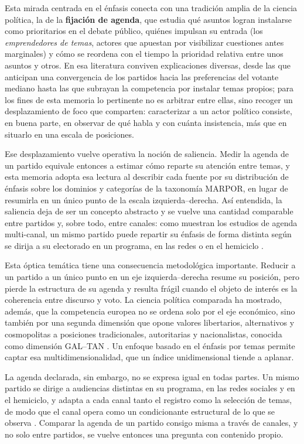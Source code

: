 Esta mirada centrada en el énfasis conecta con una tradición amplia de la ciencia
política, la de la \textbf{fijación de agenda}, que estudia qué asuntos logran
instalarse como prioritarios en el debate público, quiénes impulsan su entrada
(los \emph{emprendedores de temas}, actores que apuestan por visibilizar
cuestiones antes marginales) y cómo se reordena con el tiempo la prioridad
relativa entre unos asuntos y otros. En esa literatura conviven explicaciones
diversas, desde las que anticipan una convergencia de los partidos hacia las
preferencias del votante mediano hasta las que subrayan la competencia por
instalar temas propios; para los fines de esta memoria lo pertinente no es
arbitrar entre ellas, sino recoger un desplazamiento de foco que comparten:
caracterizar a un actor político consiste, en buena parte, en observar de qué
habla y con cuánta insistencia, más que en situarlo en una escala de posiciones.

Ese desplazamiento vuelve operativa la noción de saliencia. Medir la agenda de un
partido equivale entonces a estimar cómo reparte su atención entre temas, y esta
memoria adopta esa lectura al describir cada fuente por su distribución de énfasis
sobre los dominios y categorías de la taxonomía MARPOR, en lugar de resumirla en
un único punto de la escala izquierda--derecha. Así entendida, la saliencia deja
de ser un concepto abstracto y se vuelve una cantidad comparable entre partidos
y, sobre todo, entre canales: como muestran los estudios de agenda multi-canal, un
mismo partido puede repartir su énfasis de forma distinta según se dirija a su
electorado en un programa, en las redes o en el hemiciclo
\cite{ivanusch2024channels}.

Esta óptica temática tiene una consecuencia metodológica importante. Reducir a un
partido a un único punto en un eje izquierda--derecha resume su posición, pero
pierde la estructura de su agenda y resulta frágil cuando el objeto de interés es
la coherencia entre discurso y voto. La ciencia política comparada ha mostrado,
además, que la competencia europea no se ordena solo por el eje económico, sino
también por una segunda dimensión que opone valores libertarios, alternativos y
cosmopolitas a posiciones tradicionales, autoritarias y nacionalistas, conocida
como dimensión GAL--TAN \cite{hooghe2002galtan}. Un enfoque basado en el énfasis
por temas permite captar esa multidimensionalidad, que un índice unidimensional
tiende a aplanar.

La agenda declarada, sin embargo, no se expresa igual en todas partes. Un mismo
partido se dirige a audiencias distintas en su programa, en las redes sociales y
en el hemiciclo, y adapta a cada canal tanto el registro como la selección de
temas, de modo que el canal opera como un condicionante estructural de lo que se
observa \cite{ivanusch2024channels}. Comparar la agenda de un partido consigo
misma a través de canales, y no solo entre partidos, se vuelve entonces una
pregunta con contenido propio.

